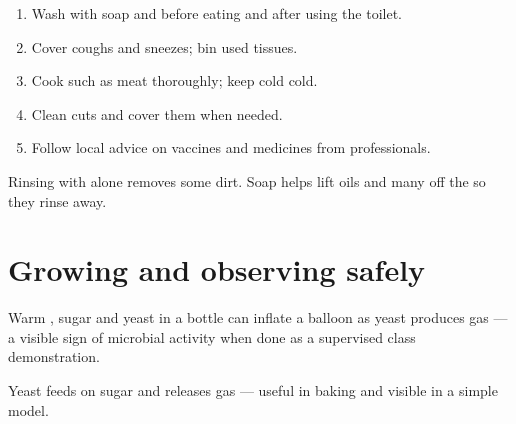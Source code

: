 \begin{method}\label{met:g4:microbes:hygiene}
\begin{enumerate}
  \item Wash  with soap and  before eating and after using
        the toilet.
  \item Cover coughs and sneezes; bin used tissues.
  \item Cook  such as meat thoroughly; keep cold  cold.
  \item Clean cuts and cover them when needed.
  \item Follow local advice on vaccines and medicines from 
        professionals.
\end{enumerate}
\end{method}

\begin{example}\label{ex:g4:microbes:soap}
Rinsing with  alone removes some dirt. Soap helps lift oils and
many  off the  so they rinse away.
\end{example}

\section{Growing and observing safely}

\begin{example}\label{ex:g4:microbes:yeast}
Warm , sugar and yeast in a bottle can inflate a balloon as yeast
produces gas --- a visible sign of microbial activity when done as a
supervised class demonstration.
\end{example}

\begin{omfigure}

{\small Yeast feeds on sugar and releases gas --- useful in baking and
visible in a simple model.}
\end{omfigure}

